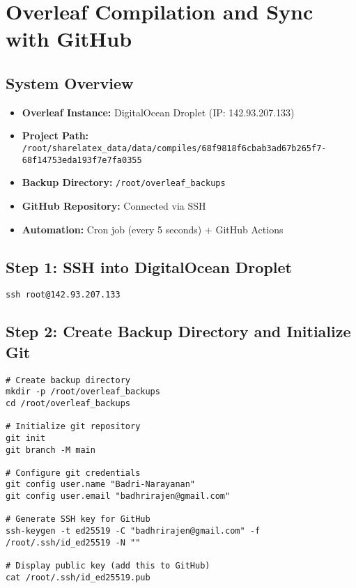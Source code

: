 \chapter{Overleaf Compilation and Sync with GitHub}
\label{chap:overleafCI}

\section{System Overview}

\begin{itemize}
    \item \textbf{Overleaf Instance:} DigitalOcean Droplet (IP: 142.93.207.133)
    \item \textbf{Project Path:} \texttt{/root/sharelatex\_data/data/compiles/68f9818f6cbab3ad67b265f7-68f14753eda193f7e7fa0355}
    \item \textbf{Backup Directory:} \texttt{/root/overleaf\_backups}
    \item \textbf{GitHub Repository:} Connected via SSH
    \item \textbf{Automation:} Cron job (every 5 seconds) + GitHub Actions
\end{itemize}

\section{Step 1: SSH into DigitalOcean Droplet}

\begin{verbatim}
ssh root@142.93.207.133
\end{verbatim}

\section{Step 2: Create Backup Directory and Initialize Git}

\begin{verbatim}
# Create backup directory
mkdir -p /root/overleaf_backups
cd /root/overleaf_backups

# Initialize git repository
git init
git branch -M main

# Configure git credentials
git config user.name "Badri-Narayanan"
git config user.email "badhrirajen@gmail.com"

# Generate SSH key for GitHub
ssh-keygen -t ed25519 -C "badhrirajen@gmail.com" -f /root/.ssh/id_ed25519 -N ""

# Display public key (add this to GitHub)
cat /root/.ssh/id_ed25519.pub
\end{verbatim}

